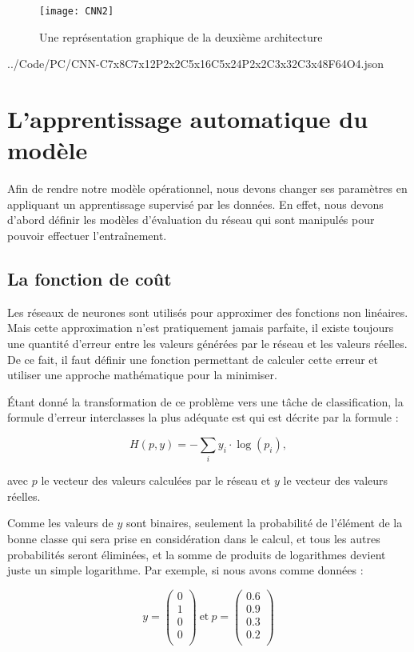 \begin{figure}[h]
  \centering
  \texttt{[image: CNN2]}
  \caption{Une représentation graphique de la deuxième architecture}
\end{figure}


{../Code/PC/CNN-C7x8C7x12P2x2C5x16C5x24P2x2C3x32C3x48F64O4.json}

\section{L'apprentissage automatique du modèle}

Afin de rendre notre modèle opérationnel, nous devons changer ses paramètres en
appliquant un apprentissage supervisé par les données. En effet, nous devons
d'abord définir les modèles d'évaluation du réseau qui sont manipulés pour pouvoir
effectuer l’entraînement.

\subsection{La fonction de coût}

Les réseaux de neurones sont utilisés pour approximer des fonctions non linéaires.
Mais cette approximation n'est pratiquement jamais parfaite, il existe toujours
une quantité d'erreur entre les valeurs générées par le réseau et les valeurs réelles.
De ce fait, il faut définir une fonction permettant de calculer cette erreur et utiliser
une approche mathématique pour la minimiser.

Étant donné la transformation de ce problème vers une tâche de classification,
la formule d'erreur interclasses la plus adéquate est 
qui est décrite par la formule :

$$
H(p, y) = -\sum_i y_i \cdot \log(p_i),
$$

avec $p$ le vecteur des valeurs calculées par le réseau et $y$ le vecteur des valeurs réelles.

Comme les valeurs de $y$ sont binaires, seulement la probabilité de l'élément de
la bonne classe qui sera prise en considération dans le calcul, et tous les autres
probabilités seront éliminées, et la somme de produits de logarithmes devient
juste un simple logarithme.
Par exemple, si nous avons comme données :

$$
y =
\begin{pmatrix}
  0\\
  1\\
  0\\
  0\\
\end{pmatrix}
~
\mathrm{et}
~
p =
\begin{pmatrix}
  0.6\\
  0.9\\
  0.3\\
  0.2\\
\end{pmatrix}
$$

